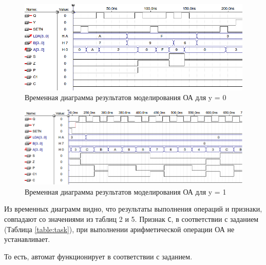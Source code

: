 \begin{figure}[H]
	\includegraphics[scale=0.5]{images/altera/rev2/final_test_log.png}
	\caption{Временная диаграмма результатов моделирования ОА для y = 0}
	\label{figure:oafin0test}
\end{figure}

\begin{figure}[H]
	\includegraphics[scale=0.5]{images/altera/rev2/final_test_ar.png}
	\caption{Временная диаграмма результатов моделирования ОА для y = 1}
	\label{figure:oafin1test}
\end{figure}

Из временных диаграмм видно, что результаты выполнения операций и признаки, совпадают со значениями из таблиц 2 и 5. Признак \texttt{C}, в соответствии с заданием (Таблица \ref{table:task}), при выполнении арифметической операции ОА не устанавливает.

То есть, автомат функционирует в соответствии с заданием.
